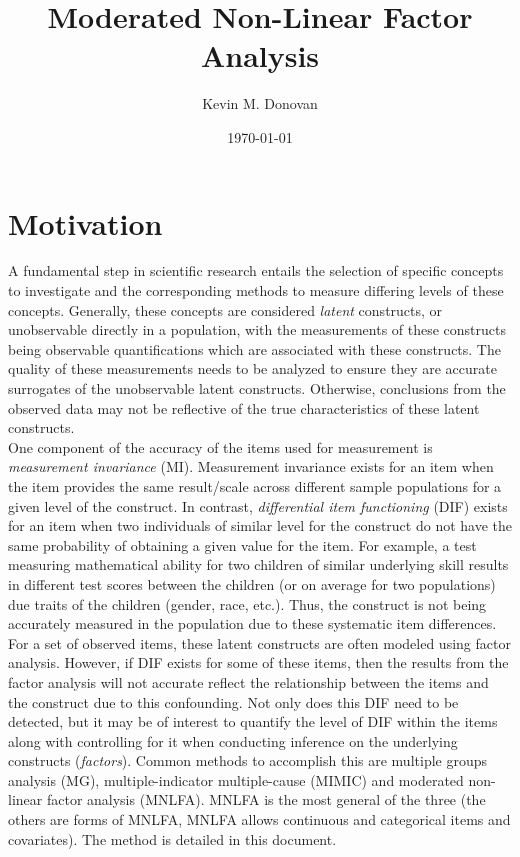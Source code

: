 \documentclass[12pt]{article}
\begin{document}
\title{\textbf{Moderated Non-Linear Factor Analysis}}
\author{Kevin M. Donovan}
\date{\today}
\maketitle

\section{Motivation}
A fundamental step in scientific research entails the selection of specific concepts to investigate and the corresponding methods to measure differing levels of these concepts.  Generally, these concepts are considered \textit{latent} constructs, or unobservable directly in a population, with the measurements of these constructs being observable quantifications which are associated with these constructs.  The quality of these measurements needs to be analyzed to ensure they are accurate surrogates of the unobservable latent constructs.  Otherwise, conclusions from the observed data may not be reflective of the true characteristics of these latent constructs.\\

One component of the accuracy of the items used for measurement is \textit{measurement invariance} (MI).  Measurement invariance exists for an item when the item provides the same result/scale across different sample populations for a given level of the construct.  In contrast, \textit{differential item functioning} (DIF) exists for an item when two individuals of similar level for the construct do not have the same probability of obtaining a given value for the item.  For example, a test measuring mathematical ability for two children of similar underlying skill results in different test scores between the children (or on average for two populations) due traits of the children (gender, race, etc.).  Thus, the construct is not being accurately measured in the population due to these systematic item differences.\\

For a set of observed items, these latent constructs are often modeled using factor analysis.  However, if DIF exists for some of these items, then the results from the factor analysis will not accurate reflect the relationship between the items and the construct due to this confounding.  Not only does this DIF need to be detected, but it may be of interest to quantify the level of DIF within the items along with controlling for it when conducting inference on the underlying constructs (\textit{factors}).  Common methods to accomplish this are multiple groups analysis (MG), multiple-indicator multiple-cause (MIMIC) and moderated non-linear factor analysis (MNLFA).  MNLFA is the most general of the three (the others are forms of MNLFA, MNLFA allows continuous and categorical items and covariates).  The method is detailed in this document.
\end{document}
